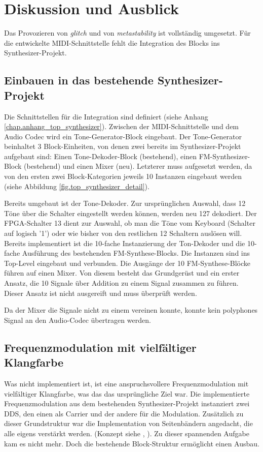 \chapter{Diskussion und Ausblick}\label{chap.diskussion}

Das Provozieren von \textit{glitch} und von \textit{metastability} ist vollständig umgesetzt. Für die entwickelte MIDI-Schnittstelle fehlt die Integration des Blocks ins Synthesizer-Projekt. 

\section{Einbauen in das bestehende Synthesizer-Projekt}

Die Schnittstellen für die Integration sind definiert (siehe Anhang \ref{chap.anhang_top_synthesizer}). Zwischen der MIDI-Schnittstelle und dem Audio Codec wird ein Tone-Generator-Block eingebaut. Der Tone-Generator beinhaltet 3 Block-Einheiten, von denen zwei bereits im Synthesizer-Projekt aufgebaut sind: Einen Tone-Dekoder-Block (bestehend), einen FM-Synthesizer-Block (bestehend) und einen Mixer (neu). Letzterer muss aufgesetzt werden, da von den ersten zwei Block-Kategorien jeweils 10 Instanzen eingebaut werden (siehe Abbildung \ref{fig.top_synthesizer_detail}). 

Bereits umgebaut ist der Tone-Dekoder. Zur ursprünglichen Auswahl, dass 12 Töne über die Schalter eingestellt werden können, werden neu 127 dekodiert. Der FPGA-Schalter 13 dient zur Auswahl, ob man die Töne vom Keyboard (Schalter auf logisch '1') oder wie bisher von den restlichen 12 Schaltern auslösen will.
Bereits implementiert ist die 10-fache Instanzierung der Ton-Dekoder und die 10-fache Ausführung des bestehenden FM-Synthese-Blocks. Die Instanzen sind ins Top-Level eingebaut und verbunden. Die Ausgänge der 10 FM-Synthese-Blöcke führen auf einen Mixer. Von diesem besteht das Grundgerüst und ein erster Ansatz, die 10 Signale über Addition zu einem Signal zusammen zu führen. Dieser Ansatz ist nicht ausgereift und muss überprüft werden.

Da der Mixer die Signale nicht zu einem vereinen konnte, konnte kein polyphones Signal an den Audio-Codec übertragen werden. 

\section{Frequenzmodulation mit vielfältiger Klangfarbe}

Was nicht implementiert ist, ist eine anspruchsvollere Frequenzmodulation mit vielfältiger Klangfarbe, was das das ursprüngliche Ziel war. Die implementierte Frequenzmodulation aus dem bestehenden Synthesizer-Projekt instanziert zwei DDS, den einen als Carrier und der andere für die Modulation. Zusätzlich zu dieser Grundstruktur war die Implementation von Seitenbändern angedacht, die alle eigens verstärkt werden. (Konzept siehe \cite{synthesizer_1}, \cite{synthesizer_2}). Zu dieser spannenden Aufgabe kam es nicht mehr. Doch die bestehende Block-Struktur ermöglicht einen Ausbau.

